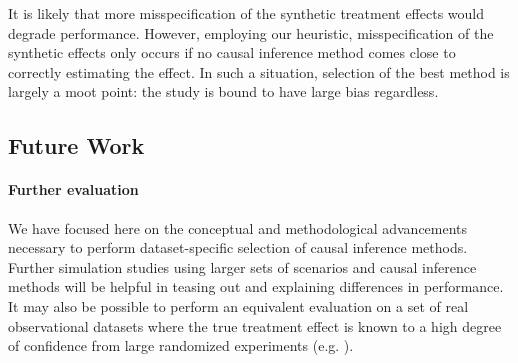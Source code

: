 
It is likely that more misspecification of the synthetic treatment effects would degrade performance. However, employing our heuristic, misspecification of the synthetic effects only occurs if no causal inference method comes close to correctly estimating the effect. In such a situation, selection of the best method is largely a moot point: the study is bound to have large bias regardless.

\subsection{Future Work}

\paragraph{Further evaluation} We have focused here on the conceptual and methodological advancements necessary to perform dataset-specific selection of causal inference methods. Further simulation studies using larger sets of scenarios and causal inference methods will be helpful in teasing out and explaining differences in performance. It may also be possible to perform an equivalent evaluation on a set of real observational datasets where the true treatment effect is known to a high degree of confidence from large randomized experiments (e.g. \citet{Madigan2014}). 


